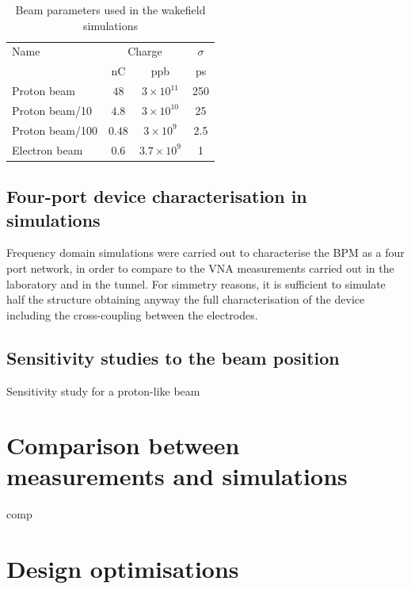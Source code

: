 \begin{table}[ht]
  \centering
    \begin{tabular}{l c c c}
    \toprule
    Name  & \multicolumn{2}{c}{Charge} & $\sigma$\\
          & nC & ppb & ps\\
    \midrule
    Proton beam								& $48$	  & $3\times10^{11}$	& 250	\\
    Proton beam/10						& $4.8$	  & $3\times10^{10}$	& 25	\\
    Proton beam/100						& $0.48$  & $3\times10^{9}$		& 2.5	\\
    Electron beam							& $0.6$	  & $3.7\times10^{9}$	& 1		\\
    \bottomrule
    \end{tabular}
  \caption{Beam parameters used in the wakefield simulations} \label{beam_param_wak:tab}
\end{table}




\subsection[Four-port device characterisation in simulations]{Four-port device characterisation in simulations}

Frequency domain simulations were carried out to characterise the BPM as a four port network, in order to compare to the VNA measurements carried out in the laboratory and in the tunnel. For simmetry reasons, it is sufficient to simulate half the structure obtaining anyway the full characterisation of the device including the cross-coupling between the electrodes.





\subsection[Sensitivity studies to the beam position]{Sensitivity studies to the beam position}

Sensitivity study for a proton-like beam


\section[Comparison between measurements and simulations]{Comparison between measurements and simulations}

comp


\section[Design optimisations]{Design optimisations}
\label{sec:optimisations}

